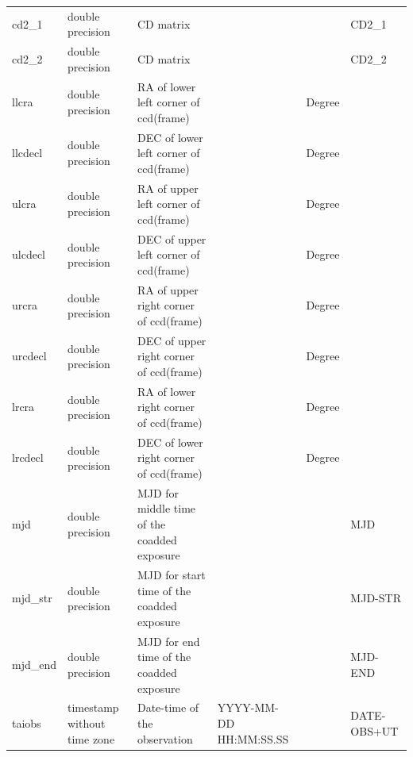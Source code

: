 \documentclass[12pt]{article}
\begin{document}
\begin{table}[thbp]
\begin{center}
{\begin{tabular}{llllll}
cd2\_1 & double precision & CD matrix                                                &                           &                  & CD2\_1       \\
cd2\_2 & double precision & CD matrix                                                &                           &                  & CD2\_2       \\
llcra & double precision & RA of lower left corner of ccd(frame)                    &                           & Degree           &             \\
llcdecl & double precision & DEC of lower left corner of ccd(frame)                   &                           & Degree           &             \\
ulcra & double precision & RA of upper left corner of ccd(frame)                    &                           & Degree           &             \\
ulcdecl & double precision & DEC of upper left corner of ccd(frame)                   &                           & Degree           &             \\
urcra & double precision & RA of upper right corner of ccd(frame)                   &                           & Degree           &             \\
urcdecl & double precision & DEC of upper right corner of ccd(frame)                  &                           & Degree           &             \\
lrcra & double precision & RA of lower right corner of ccd(frame)                   &                           & Degree           &             \\
lrcdecl & double precision & DEC of lower right corner of ccd(frame)                  &                           & Degree           &             \\
mjd & double precision & MJD for middle time of the coadded exposure              &                           &                  & MJD         \\
mjd\_str & double precision & MJD for start time of the coadded exposure               &                           &                  & MJD-STR     \\
mjd\_end & double precision & MJD for end time of the coadded exposure                 &                           &                  & MJD-END     \\
taiobs & timestamp without time zone & Date-time of the observation                             & YYYY-MM-DD HH:MM:SS.SS    &                  & DATE-OBS+UT  \\

\end{tabular}}
\end{center}
\end{table}
\end{document}

